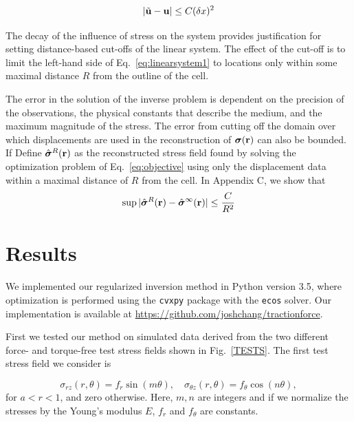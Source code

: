 \documentclass[aps,prl,reprint,twocolumn,groupedaddress,showpacs]{revtex4}
\newcommand{\bsigma}{{\boldsymbol\sigma}}
\def\r{{\bf r}}
\def\u{{\bf u}}
\begin{document}
\begin{equation}
\vert \tilde{\u}  - \u \vert \leq C (\delta x)^2
\end{equation}

The decay of the influence of stress on the system provides
justification for setting distance-based cut-offs of the linear
system. The effect of the cut-off is to limit the left-hand side of
Eq.~\ref{eq:linearsystem1} to locations only within some maximal
distance $R$ from the outline of the cell.

The error in the solution of the inverse problem is dependent on the
precision of the observations, the physical constants that describe
the medium, and the maximum magnitude of the stress. The error from
cutting off the domain over which displacements are used in the
reconstruction of $\bsigma(\r)$ can also be bounded. If
Define $\hat{\bsigma}^R(\r)$ as the reconstructed stress field found by
solving the optimization problem of Eq.~\ref{eq:objective} using only
the displacement data within a maximal distance of $R$ from the
cell. In Appendix C, we show that 
\begin{equation}
\sup \vert \hat{\bsigma}^R(\r) - \hat{\bsigma}^\infty(\r) \vert \leq \frac{C}{R^2}
\end{equation}

\section{Results}

We implemented our regularized inversion method in Python version 3.5,
where optimization is performed using the \texttt{cvxpy} package with
the \texttt{ecos} solver.  Our implementation is available at
\url{https://github.com/joshchang/tractionforce}. 

First we tested our method on simulated data derived from the two
different force- and torque-free test stress fields shown in
Fig.~\ref{TESTS}. The first test stress field we consider is

\begin{equation}
\sigma_{rz}(r,\theta) = f_{r} \sin (m\theta),\quad 
\sigma_{\theta z}(r,\theta) = f_{\theta} \cos (n\theta),
\end{equation}
%
for $a < r < 1$, and zero otherwise. Here, $m,n$ are integers and
if we normalize the stresses by the Young's modulus $E$, $f_{r}$ and
$f_{\theta}$ are constants.
\end{document}
